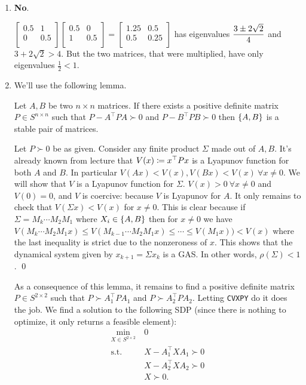 \begin{enumerate}[leftmargin=*]
\item \textbf{No}. 

$\begin{bmatrix}0.5&1\\0&0.5\\\end{bmatrix} \begin{bmatrix}0.5&0\\1&0.5\\\end{bmatrix}=\begin{bmatrix}1.25&0.5\\0.5&0.25\\\end{bmatrix}$ has eigenvalues $\displaystyle\frac{3\pm 2\sqrt 2}4$ and $3+2\sqrt 2>4$. But the two matrices, that were multiplied, have only eigenvalues $\frac{1}{2}<1$.

\item We'll use the following lemma.

\begin{lemma}
Let $A,B$ be two $n\times n$ matrices. If there exists a positive definite matrix $P\in S^{n\times n}$ such that $P-A^{\top}PA\succ 0$ and $P-B^{\top}PB \succ 0$ then $\left\{A,B\right\}$ is a stable pair of matrices.
\end{lemma}
\begin{pf}
Let $P\succ 0$ be as given. Consider any finite product $\Sigma$ made out of $A,B$. It's already known from lecture that $V(x)\coloneqq x^{\top}Px$ is a Lyapunov function for both $A$ and $B$. In particular $V(Ax) < V(x), V(Bx)<V(x)~\forall x\ne 0$. We will show that $V$ is a Lyapunov function for $\Sigma$. $V(x)>0~\forall x\ne 0$ and $V(0)=0$, and $V$ is coercive: because $V$ is Lyapunov for $A$. It only remains to check that $V(\Sigma x) < V(x)$ for $x\ne 0$. This is clear because if $\Sigma=M_{k}\cdots M_{2}M_{1}$ where $X_{i}\in\left\{A,B\right\}$ then for $x\ne 0$ we have $V(M_{k}\cdots M_{2}M_{1} x) \le V(M_{k-1}\cdots M_{2}M_{1} x) \le \cdots \le V(M_{1} x)) < V(x)$ where the last inequality is strict due to the nonzeroness of $x$. This shows that the dynamical system given by $x_{k+1}=\Sigma x_{k}$ is a GAS. In other words, $\rho(\Sigma)<1$.
\qed\end{pf}

As a consequence of this lemma, it remains to find a positive definite matrix $P\in S^{2\times 2}$ such that $P\succ A_{1}^{\top}P A_{1}$ and $P\succ A_{2}^{\top}P A_{2}$. Letting \texttt{CVXPY} do it does the job. We find a solution to the following SDP (since there is nothing to optimize, it only returns a feasible element): \begin{align*}
\min_{X\in S^{2\times 2}} &~ 0\\
\text{s.t.}&~ X - A_{1}^{\top} X  A_{1} \succ 0\\
&~ X - A_{2}^{\top} X  A_{2} \succ 0\\
&~ X \succ 0.
\end{align*}


\end{enumerate}
